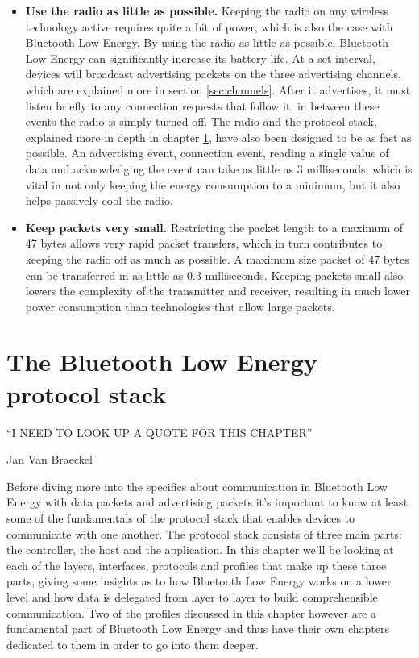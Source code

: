 \documentclass[pdftex,a4paper,12pt,twoside]{report}
\begin{document}
\begin{itemize}
\item{\textbf{Use the radio as little as possible.} Keeping the radio on any wireless technology active requires quite a bit of power, which is also the case with Bluetooth Low Energy. By using the radio as little as possible, Bluetooth Low Energy can significantly increase its battery life. At a set interval, devices will broadcast advertising packets on the three advertising channels, which are explained more in section \ref{sec:channels}. After it advertises, it must listen briefly to any connection requests that follow it, in between these events the radio is simply turned off. The radio and the protocol stack, explained more in depth in chapter \ref{ch:protocolstack}, have also been designed to be as fast as possible. An advertising event, connection event, reading a single value of data and acknowledging the event can take as little as 3 milliseconds, which is vital in not only keeping the energy consumption to a minimum, but it also helps passively cool the radio.}

\item{\textbf{Keep packets very small.} Restricting the packet length to a maximum of 47 bytes allows very rapid packet transfers, which in turn contributes to keeping the radio off as much as possible. A maximum size packet of 47 bytes can be transferred in as little as 0.3 milliseconds. Keeping packets small also lowers the complexity of the transmitter and receiver, resulting in much lower power consumption than technologies that allow large packets.}
\end{itemize}

\chapter{The Bluetooth Low Energy protocol stack}
\label{ch:protocolstack}
\epigraph{``I NEED TO LOOK UP A QUOTE FOR THIS CHAPTER''}{Jan Van Braeckel}
Before diving more into the specifics about communication in Bluetooth Low Energy with data packets and advertising packets it's important to know at least some of the fundamentals of the protocol stack that enables devices to communicate with one another. The protocol stack consists of three main parts: the controller, the host and the application. In this chapter we'll be looking at each of the layers, interfaces, protocols and profiles that make up these three parts, giving some insights as to how Bluetooth Low Energy works on a lower level and how data is delegated from layer to layer to build comprehensible communication. Two of the profiles discussed in this chapter however are a fundamental part of Bluetooth Low Energy and thus have their own chapters dedicated to them in order to go into them deeper.
\end{document}
